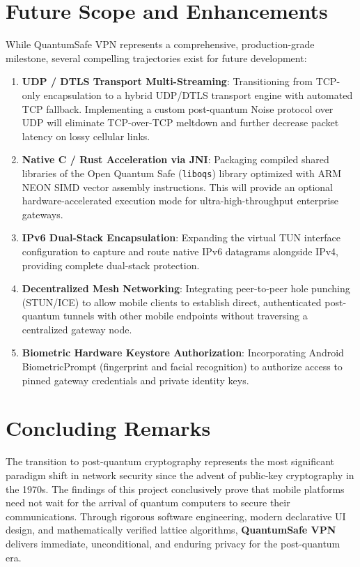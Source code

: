 \section{Future Scope and Enhancements}
\label{sec:future_scope}

While QuantumSafe VPN represents a comprehensive, production-grade milestone, several compelling trajectories exist for future development:

\begin{enumerate}
    \item \textbf{UDP / DTLS Transport Multi-Streaming}: Transitioning from TCP-only encapsulation to a hybrid UDP/DTLS transport engine with automated TCP fallback. Implementing a custom post-quantum Noise protocol over UDP will eliminate TCP-over-TCP meltdown and further decrease packet latency on lossy cellular links.
    \item \textbf{Native C / Rust Acceleration via JNI}: Packaging compiled shared libraries of the Open Quantum Safe (\texttt{liboqs}) library optimized with ARM NEON SIMD vector assembly instructions. This will provide an optional hardware-accelerated execution mode for ultra-high-throughput enterprise gateways.
    \item \textbf{IPv6 Dual-Stack Encapsulation}: Expanding the virtual TUN interface configuration to capture and route native IPv6 datagrams alongside IPv4, providing complete dual-stack protection.
    \item \textbf{Decentralized Mesh Networking}: Integrating peer-to-peer hole punching (STUN/ICE) to allow mobile clients to establish direct, authenticated post-quantum tunnels with other mobile endpoints without traversing a centralized gateway node.
    \item \textbf{Biometric Hardware Keystore Authorization}: Incorporating Android BiometricPrompt (fingerprint and facial recognition) to authorize access to pinned gateway credentials and private identity keys.
\end{enumerate}

\section{Concluding Remarks}
\label{sec:concluding_remarks}

The transition to post-quantum cryptography represents the most significant paradigm shift in network security since the advent of public-key cryptography in the 1970s. The findings of this project conclusively prove that mobile platforms need not wait for the arrival of quantum computers to secure their communications. Through rigorous software engineering, modern declarative UI design, and mathematically verified lattice algorithms, \textbf{QuantumSafe VPN} delivers immediate, unconditional, and enduring privacy for the post-quantum era.
